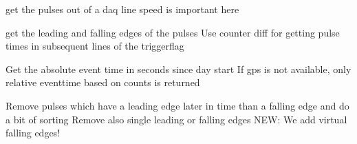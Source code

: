 \documentclass[letterpaper,10pt,english]{sphinxmanual}
\begin{document}
\begin{fulllineitems}
\label{muonic:muonic.analysis.PulseAnalyzer.PulseExtractor}
get the pulses out of a daq line
speed is important here

\begin{fulllineitems}
\label{muonic:muonic.analysis.PulseAnalyzer.PulseExtractor._calculate_edges}
get the leading and falling edges of the pulses
Use counter diff for getting pulse times in subsequent 
lines of the triggerflag

\end{fulllineitems}


\begin{fulllineitems}
\label{muonic:muonic.analysis.PulseAnalyzer.PulseExtractor._get_evt_time}
Get the absolute event time in seconds since day start
If gps is not available, only relative eventtime based on counts
is returned

\end{fulllineitems}


\begin{fulllineitems}
\label{muonic:muonic.analysis.PulseAnalyzer.PulseExtractor._order_and_cleanpulses}
Remove pulses which have a 
leading edge later in time than a 
falling edge and do a bit of sorting
Remove also single leading or falling edges
NEW: We add virtual falling edges!

\end{fulllineitems}


\begin{fulllineitems}
\label{muonic:muonic.analysis.PulseAnalyzer.PulseExtractor.close_file}
\end{fulllineitems}


\end{fulllineitems}
\end{document}

